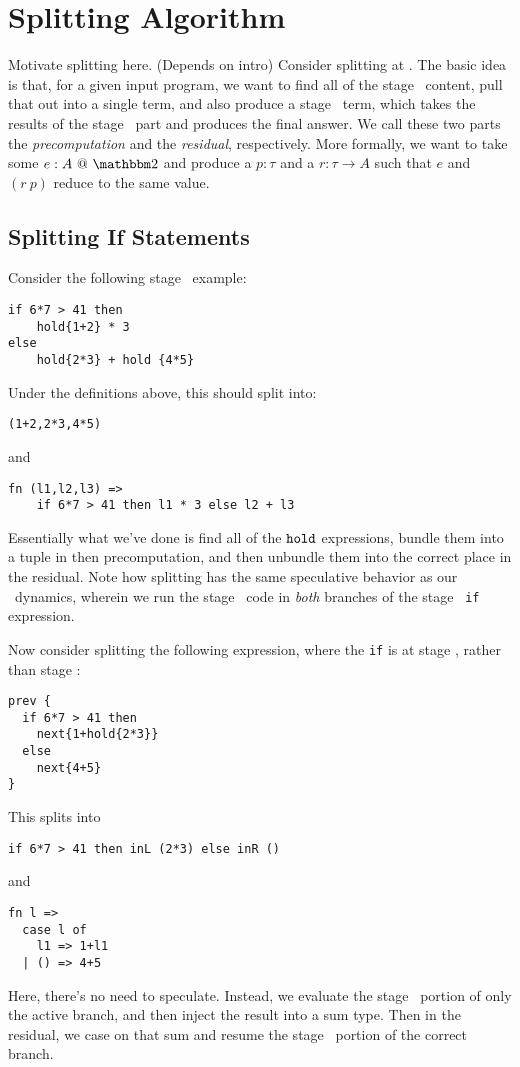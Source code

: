 
\section{Splitting Algorithm}

Motivate splitting here.  (Depends on intro)
Consider splitting at \bbtwo. 
The basic idea is that, for a given input program, we want to find all of the stage \bbone\ content, pull that out into a single term, 
and also produce a stage \bbtwo\ term, which takes the results of the stage \bbone\ part and produces the final answer.
We call these two parts the {\em precomputation} and the {\em residual}, respectively.
More formally, we want to take some $\coltwo e A$ and produce a $p : \tau$ and a $r : \tau \to A$ such that $e$ and $(r~p)$ reduce to the same value.

\subsection {Splitting If Statements}

Consider the following stage \bbtwo\ example:
\begin{lstlisting}
if 6*7 > 41 then
	hold{1+2} * 3
else 
	hold{2*3} + hold {4*5}
\end{lstlisting}
Under the definitions above, this should split into:
\begin{lstlisting}
(1+2,2*3,4*5)
\end{lstlisting}
and
\begin{lstlisting}
fn (l1,l2,l3) => 
    if 6*7 > 41 then l1 * 3 else l2 + l3
\end{lstlisting}
Essentially what we've done is find all of the ${\tt hold}$ expressions, 
bundle them into a tuple in then precomputation, 
and then unbundle them into the correct place in the residual.
Note how splitting has the same speculative behavior as our \lang\ dynamics,
wherein we run the stage \bbone\ code in {\em both} branches of the stage \bbtwo\ {\tt if} expression.

Now consider splitting the following expression, where the {\tt if} is at stage \bbone, rather than stage \bbtwo:
\begin{lstlisting}
prev {
  if 6*7 > 41 then
    next{1+hold{2*3}}
  else 
    next{4+5}
}
\end{lstlisting}
This splits into
\begin{lstlisting}
if 6*7 > 41 then inL (2*3) else inR ()
\end{lstlisting}
and
\begin{lstlisting}
fn l => 
  case l of
    l1 => 1+l1
  | () => 4+5
\end{lstlisting}
Here, there's no need to speculate.
Instead, we evaluate the stage \bbone\ portion of only the active branch, and then inject the result into a sum type.
Then in the residual, we case on that sum and resume the stage \bbtwo\ portion of the correct branch.

